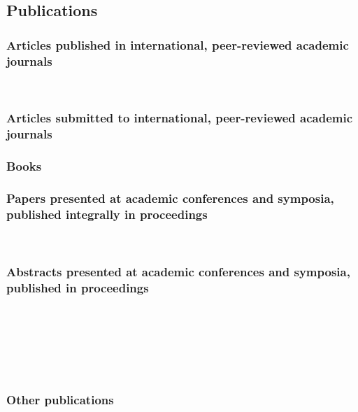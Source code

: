 \subsection*{Publications}
\subsubsection*{Articles published in international, peer-reviewed academic journals}
\\[4pt]

\subsubsection*{Articles submitted to international, peer-reviewed academic journals}

\subsubsection*{Books}

\subsubsection*{Papers presented at academic conferences and symposia, published integrally in proceedings}
\\[4pt]

\subsubsection*{Abstracts presented at academic conferences and symposia, published in proceedings}
\\[4pt]
\\[4pt]
\\[4pt]
\\[4pt]
\\[4pt]

\subsubsection*{Other publications}
\\[4pt]
\\[4pt]
\\[4pt]
\\[4pt]


\cleardoublepage

